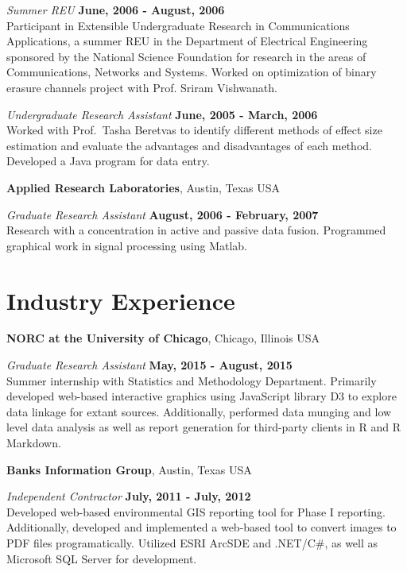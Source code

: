 \documentclass[margin,line]{res}
\begin{document}
\begin{resume}
{\em Summer REU} \hfill {\bf June, 2006 - August, 2006}\\
Participant in Extensible Undergraduate Research in Communications Applications, a summer REU in the Department of Electrical Engineering sponsored by the National Science Foundation for research in the areas of Communications, Networks and Systems. Worked on optimization of binary erasure channels project with Prof. Sriram Vishwanath.

{\em Undergraduate Research Assistant} \hfill {\bf June, 2005 - March, 2006}\\
Worked with Prof.\ Tasha Beretvas to identify different methods of effect size estimation and evaluate the advantages and disadvantages of each method. Developed a Java program for data entry.

\vspace{-.1cm}
{\bf Applied Research Laboratories}, Austin, Texas USA

\vspace{-.3cm}
{\em Graduate Research Assistant} \hfill {\bf August, 2006 - February, 2007}\\
Research with a concentration in active and passive data fusion. Programmed graphical work in signal processing using Matlab.

\section{\sc Industry Experience}
{\bf NORC at the University of Chicago}, Chicago, Illinois USA

\vspace{-.3cm}
{\em Graduate Research Assistant} \hfill {\bf May, 2015 - August, 2015}\\
Summer internship with Statistics and Methodology Department. Primarily developed web-based interactive graphics using JavaScript library D3 to explore data linkage for extant sources. Additionally, performed data munging and low level data analysis as well as report generation for third-party clients in R and R Markdown.

{\bf Banks Information Group}, Austin, Texas USA

\vspace{-.3cm}
{\em Independent Contractor} \hfill {\bf July, 2011 - July, 2012}\\
Developed web-based environmental GIS reporting tool for Phase I reporting. Additionally, developed and implemented a web-based tool to convert images to PDF files programatically.  Utilized ESRI ArcSDE and .NET/C\#, as well as Microsoft SQL Server for development.


\end{resume}
\end{document}
